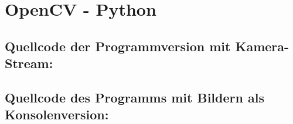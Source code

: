 
\section{OpenCV - Python}
\label{sec:OpenCV}

\subsection{Quellcode der Programmversion mit Kamera-Stream:}
\lstset{language=Python}


\subsection{Quellcode des Programms mit Bildern als Konsolenversion:}
\lstset{language=Python}

